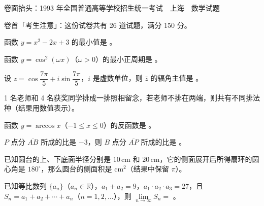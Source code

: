 

\begin{gktip}
卷面抬头：1993 年全国普通高等学校招生统一考试　上海　数学试题

卷首「考生注意」：这份试卷共有 26 道试题，满分 150 分。
\end{gktip}


\begin{question}
函数 $y=x^2-2x+3$ 的最小值是 \gkblank{}。

\end{question}
\begin{question}
函数 $y=\cos^2(\omega x)$（$\omega>0$）的最小正周期是 \gkblank{}。

\end{question}
\begin{question}
设 $z=\cos\dfrac{7\pi}{5}+i\sin\dfrac{7\pi}{5}$，$i$ 是虚数单位，则 $\bar z$ 的辐角主值是 \gkblank{}。

\end{question}
\begin{question}
1 名老师和 4 名获奖同学排成一排照相留念，若老师不排在两端，则共有不同排法 \gkblank{} 种（结果用数值表示）。

\end{question}
\begin{question}
函数 $y=\arccos x$（$-1\le x\le 0$）的反函数是 \gkblank{}。

\end{question}
\begin{question}
$P$ 点分 $\overline{AB}$ 所成的比是 $-3$，则 $B$ 点分 $\overline{AP}$ 所成的比是 \gkblank{}。

\end{question}
\begin{question}
已知圆台的上、下底面半径分别是 $10\,\mathrm{cm}$ 和 $20\,\mathrm{cm}$，它的侧面展开后所得扇环的圆心角是 $180^\circ$，那么圆台的侧面积是 \gkblank{} $\mathrm{cm}^2$（结果中保留 $\pi$）。

\end{question}
\begin{question}
已知等比数列 $\{a_n\}$（$a_n\in\mathbb{R}$），$a_1+a_2=9$，$a_1\cdot a_2\cdot a_3=27$，且 $S_n=a_1+a_2+\cdots+a_n$（$n=1,2,\ldots$），则 $\lim\limits_{n\to\infty}S_n=$ \gkblank{}。

\end{question}
